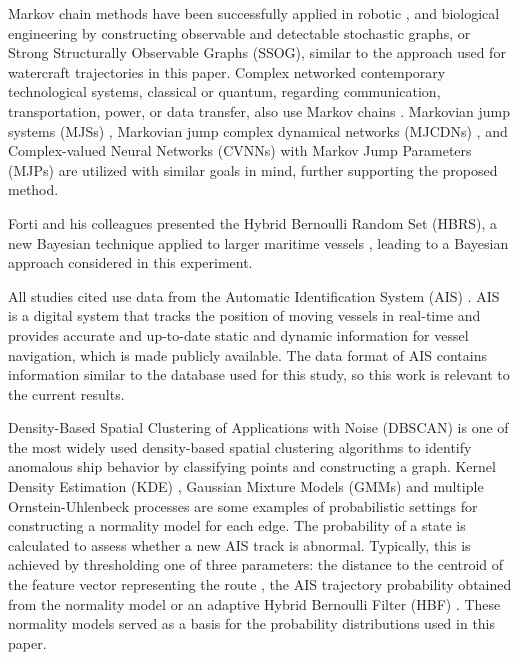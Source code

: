 \documentclass[preprint,12pt]{elsarticle}
\begin{document}
Markov chain methods have been successfully applied in robotic \cite{10130587}, and biological engineering \cite{10106394, 10309224} by constructing observable and detectable stochastic graphs, or Strong Structurally Observable Graphs (SSOG), similar to the approach used for watercraft trajectories in this paper. Complex networked contemporary technological systems, classical or quantum, regarding communication, transportation, power, or data transfer, also use Markov chains \cite{JAFARIZADEH2024107151}. Markovian jump systems (MJSs) \cite{YAO2024107194, SHEN2024107250, LIU2024107294}, Markovian jump complex dynamical networks (MJCDNs) \cite{ZHOU2024107251}, and Complex-valued Neural Networks (CVNNs) with Markov Jump Parameters (MJPs) \cite{ZHANG2024107324} are utilized with similar goals in mind, further supporting the proposed method.

Forti and his colleagues presented the Hybrid Bernoulli Random Set (HBRS), a new Bayesian technique applied to larger maritime vessels \citep{2018Forti, 2019Forti, 2020FortiO, 2022Forti2, 2022FortiO, 2022Forti1}, leading to a Bayesian approach considered in this experiment.

All studies cited use data from the Automatic Identification System (AIS) \citep{2016Ning}. AIS is a digital system that tracks the position of moving vessels in real-time and provides accurate and up-to-date static and dynamic information for vessel navigation, which is made publicly available. The data format of AIS contains information similar to the database used for this study, so this work is relevant to the current results.

Density-Based Spatial Clustering of Applications with Noise (DBSCAN) \citep{Ester1996ADA} is one of the most widely used density-based spatial clustering algorithms to identify anomalous ship behavior \citep{2018Coscia, 2018dAfflisio1, 2016Millefiori, Khan2004RealtimePO, 2021Pedroche} by classifying points and constructing a graph. Kernel Density Estimation (KDE) \citep{2013Pallotta, 2020Loi}, Gaussian Mixture Models (GMMs) \citep{2008Laxhammar} and multiple Ornstein-Uhlenbeck processes \citep{2019Forti, 2018Coscia1, 2014Pallotta} are some examples of probabilistic settings for constructing a normality model for each edge. The probability of a state is calculated to assess whether a new AIS track is abnormal. Typically, this is achieved by thresholding one of three parameters: the distance to the centroid of the feature vector representing the route \citep{Varlamis2019ANA}, the AIS trajectory probability obtained from the normality model \citep{2013Pallotta} or an adaptive Hybrid Bernoulli Filter (HBF) \citep{2019Forti}. These normality models served as a basis for the probability distributions used in this paper.
\end{document}
